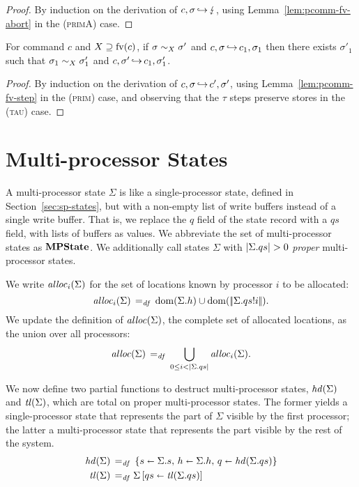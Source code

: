 \documentclass[11pt]{report}
\begin{document}
\begin{proof}
	By induction on the derivation of $c,\sigma \operatorname{\hookrightarrow} \lightning$, using Lemma~\ref{lem:pcomm-fv-abort} in the \textsc{(primA)} case. 
\end{proof}

\begin{lemma}\label{lem:comm-fv-step}
	For command $c$ and $X \supseteq \mathrm{fv}(c)$, if $\sigma \sim_{X} \sigma'$ and $c,\sigma \operatorname{\hookrightarrow} c_1,\sigma_1$ then there exists $\sigma'_1$  such that $\sigma_1 \sim_{X} \sigma_1'$ and $c,\sigma' \operatorname{\hookrightarrow} c_1,\sigma'_1$.
\end{lemma}

\begin{proof}
	 By induction on the derivation of $c,\sigma \operatorname{\hookrightarrow} c',\sigma'$, using Lemma~\ref{lem:pcomm-fv-step} in the \textsc{(prim)} case, and observing that the $\tau$ steps preserve stores in the \textsc{(tau)} case.
\end{proof}


\section{Multi-processor States} %
\label{sec:mp-states}

A multi-processor state $\Sigma$ is like a single-processor state, defined in Section~\ref{sec:sp-states}, but with a non-empty list of write buffers instead of a single write buffer. That is, we replace the $q$ field of the state record with a $qs$ field, with lists of buffers as values. We abbreviate the set of multi-processor states as $\mathbf{MPState}$. We additionally call states $\Sigma$ with $|\Sigma.qs| > 0$ \emph{proper} multi-processor states. 

We write $\mathit{alloc}_{i}(\Sigma)$ for the set of locations known by processor $i$ to be allocated: \begin{equation}
	\label{eq:allocat}
	\allocat{i}{\Sigma} \eqdef \dom{\Sigma.h} \cup \dom{\elems{\nth{i}{\Sigma.qs}}}.
\end{equation} We update the definition of $\mathit{alloc}(\Sigma)$, the complete set of allocated locations, as the union over all processors: \begin{equation}
	\label{eq:mpalloc}
	\alloc{\Sigma} \eqdef \bigcup_{0 \leq i < \llen{\Sigma.qs}} \allocat{i}{\Sigma}.  
\end{equation} 

We now define two partial functions to destruct multi-processor states, $\mathit{hd}(\Sigma)$ and $\mathit{tl}(\Sigma)$, which are total on proper multi-processor states. The former yields a single-processor state that represents the part of $\Sigma$ visible by the first processor; the latter a multi-processor state that represents the part visible by the rest of the system. \begin{align}
	\label{eq:mphdtl}
	\lhead{\Sigma} \eqdef & \reclit{\ptup{s}{\Sigma.s},\, \ptup{h}{\Sigma.h},\, \ptup{q}{\lhead{\Sigma.qs}}} \\
	\ltail{\Sigma} \eqdef & \funup{\Sigma}{\ptup{qs}{\ltail{\Sigma.qs}}}
\end{align}
\end{document}
